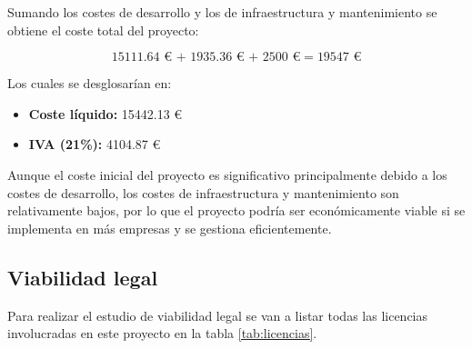 Sumando los costes de desarrollo y los de infraestructura y mantenimiento se obtiene el coste total del proyecto:

\[\num{15111,64} \text{ € + } \num{1935,36} \text{ € + } \num{2500} \text{ €} = \num{19547} \text{ €}\]

Los cuales se desglosarían en:

\begin{itemize}
	\item \textbf{Coste líquido:} \num{15442,13} €
	\item \textbf{IVA (21\%):} \num{4104,87} €
\end{itemize}

Aunque el coste inicial del proyecto es significativo principalmente debido a los costes de desarrollo, los costes de infraestructura y mantenimiento son relativamente bajos, por lo que el proyecto podría ser económicamente viable si se implementa en más empresas y se gestiona eficientemente.

\subsection{Viabilidad legal}

Para realizar el estudio de viabilidad legal se van a listar todas las licencias involucradas en este proyecto en la tabla \ref{tab:licencias}.


